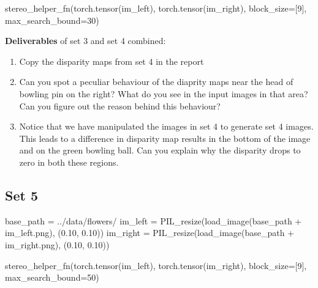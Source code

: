 \documentclass[
  letterpaper,
  DIV=11,
  numbers=noendperiod]{scrartcl}
\newenvironment{Shaded}{\begin{snugshade}}{\end{snugshade}}
\newcommand{\DecValTok}[1]{\textcolor[rgb]{0.68,0.00,0.00}{#1}}
\newcommand{\FloatTok}[1]{\textcolor[rgb]{0.68,0.00,0.00}{#1}}
\newcommand{\NormalTok}[1]{\textcolor[rgb]{0.00,0.23,0.31}{#1}}
\newcommand{\OperatorTok}[1]{\textcolor[rgb]{0.37,0.37,0.37}{#1}}
\newcommand{\StringTok}[1]{\textcolor[rgb]{0.13,0.47,0.30}{#1}}
\providecommand{\tightlist}{%
  \setlength{\itemsep}{0pt}\setlength{\parskip}{0pt}}\usepackage{longtable,booktabs,array}
\begin{document}
\begin{Shaded}
\begin{Highlighting}[]
\NormalTok{stereo\_helper\_fn(torch.tensor(im\_left), torch.tensor(im\_right), block\_size}\OperatorTok{=}\NormalTok{[}\DecValTok{9}\NormalTok{], max\_search\_bound}\OperatorTok{=}\DecValTok{30}\NormalTok{)}
\end{Highlighting}
\end{Shaded}

\textbf{Deliverables} of set 3 and set 4 combined:

\begin{enumerate}
\def\labelenumi{\arabic{enumi}.}
\tightlist
\item
  Copy the disparity maps from set 4 in the report
\item
  Can you spot a peculiar behaviour of the diaprity maps near the head
  of bowling pin on the right? What do you see in the input images in
  that area? Can you figure out the reason behind this behaviour?
\item
  Notice that we have manipulated the images in set 4 to generate set 4
  images. This leads to a difference in disparity map results in the
  bottom of the image and on the green bowling ball. Can you explain why
  the disparity drops to zero in both these regions.
\end{enumerate}

\hypertarget{set-5}{%
\subsection{Set 5}\label{set-5}}

\begin{Shaded}
\begin{Highlighting}[]
\NormalTok{base\_path }\OperatorTok{=} \StringTok{\textquotesingle{}../data/flowers/\textquotesingle{}}
\NormalTok{im\_left }\OperatorTok{=}\NormalTok{ PIL\_resize(load\_image(base\_path }\OperatorTok{+} \StringTok{\textquotesingle{}im\_left.png\textquotesingle{}}\NormalTok{), (}\FloatTok{0.10}\NormalTok{, }\FloatTok{0.10}\NormalTok{))}
\NormalTok{im\_right }\OperatorTok{=}\NormalTok{ PIL\_resize(load\_image(base\_path }\OperatorTok{+} \StringTok{\textquotesingle{}im\_right.png\textquotesingle{}}\NormalTok{), (}\FloatTok{0.10}\NormalTok{, }\FloatTok{0.10}\NormalTok{))}
\end{Highlighting}
\end{Shaded}

\begin{Shaded}
\begin{Highlighting}[]
\NormalTok{stereo\_helper\_fn(torch.tensor(im\_left), torch.tensor(im\_right), block\_size}\OperatorTok{=}\NormalTok{[}\DecValTok{9}\NormalTok{], max\_search\_bound}\OperatorTok{=}\DecValTok{50}\NormalTok{)}
\end{Highlighting}
\end{Shaded}
\end{document}
